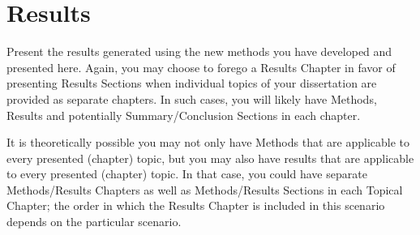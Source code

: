 \chapter{Results}\label{chap:results}

Present the results generated using the new methods you have developed and presented here. Again, you may choose to forego a Results Chapter in favor of presenting Results Sections when individual topics of your dissertation are provided as separate chapters. In such cases, you will likely have Methods, Results and potentially Summary/Conclusion Sections in each chapter. 

It is theoretically possible you may not only have Methods that are applicable to every presented (chapter) topic, but you may also have results that are applicable to every presented (chapter) topic. In that case, you could have separate Methods/Results Chapters as well as Methods/Results Sections in each Topical Chapter; the order in which the Results Chapter is included in this scenario depends on the particular scenario.

\endinput

